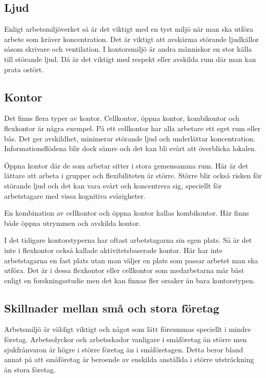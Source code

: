 \subsection{Ljud}
Enligt arbetsmiljöverket så är det viktigt med en tyst miljö när man ska utföra arbete som kräver koncentration. Det är viktigt att avskärma störande ljudkällor såsom skrivare och ventilation. I kontorsmiljö är andra människor en stor källa till störande ljud. Då är det viktigt med respekt eller avskilda rum där man kan prata ostört. \cite{AVLjud}

\subsection{Kontor}
Det finns flera typer av kontor. Cellkontor, öppna kontor, kombikontor och flexkontor är några exempel. På ett cellkontor har alla arbetare ett eget rum eller bås. Det ger avskildhet, minimerar störande ljud och underlättar koncentration. Informationsflödena blir dock sämre och det kan bli svårt att överblicka lokalen.

Öppna kontor där de som arbetar sitter i stora gemensamma rum. Här är det lättare att arbeta i grupper och flexibiliteten är större. Större blir också risken för störande ljud och det kan vara svårt och koncentrera sig, speciellt för arbetstagare med vissa kognitiva svårigheter.

En kombination av cellkontor och öppna kontor kallas kombikontor. Här finns både öppna utrymmen och avskilda kontor.

I det tidigare kontorstyperna har oftast arbetstagarna sin egen plats. Så är det inte i flexkontor också kallade aktivitetsbaserade kontor. Här har inte arbetstagarna en fast plats utan man väljer en plats som passar arbetet man ska utföra. Det är i dessa flexkontor eller cellkontor som medarbetarna mår bäst enligt en forskningsstudie men det kan finnas fler orsaker än bara kontorstypen. \cite{AVKontor}

\subsection{Skillnader mellan små och stora företag}
Arbetsmiljö är väldigt viktigt och något som lätt försummas speciellt i mindre företag. Arbetsolyckor och arbetsskador vanligare i småföretag än större men sjukfrånvaron är högre i större företag än i småföretagen. Detta beror bland annat på att småföretag är beroende av enskilda anställda i större utsträckning än stora företag.\cite{smaforetag}


